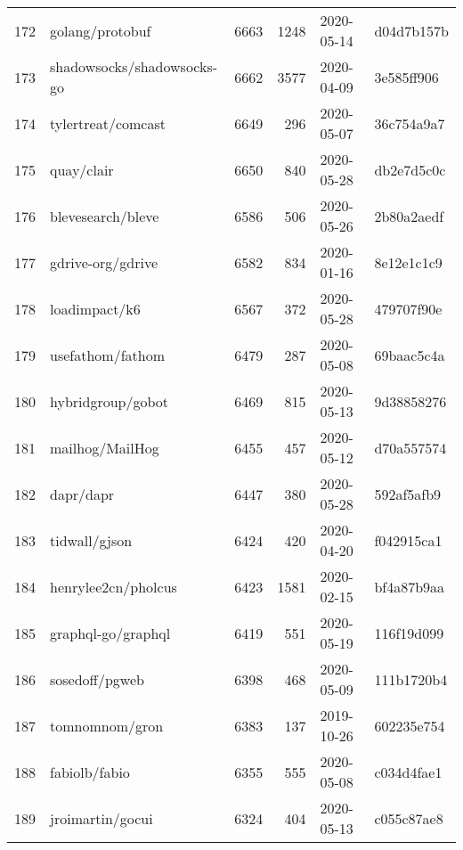 \begin{longtable}{llrrll}
    172 &                                    golang/protobuf &   6663 &   1248 & 2020-05-14 &  d04d7b157b \\
    173 &                         shadowsocks/shadowsocks-go &   6662 &   3577 & 2020-04-09 &  3e585ff906 \\
    174 &                                 tylertreat/comcast &   6649 &    296 & 2020-05-07 &  36c754a9a7 \\
    175 &                                         quay/clair &   6650 &    840 & 2020-05-28 &  db2e7d5c0c \\
    176 &                                  blevesearch/bleve &   6586 &    506 & 2020-05-26 &  2b80a2aedf \\
    177 &                                  gdrive-org/gdrive &   6582 &    834 & 2020-01-16 &  8e12e1c1c9 \\
    178 &                                      loadimpact/k6 &   6567 &    372 & 2020-05-28 &  479707f90e \\
    179 &                                   usefathom/fathom &   6479 &    287 & 2020-05-08 &  69baac5c4a \\
    180 &                                  hybridgroup/gobot &   6469 &    815 & 2020-05-13 &  9d38858276 \\
    181 &                                    mailhog/MailHog &   6455 &    457 & 2020-05-12 &  d70a557574 \\
    182 &                                          dapr/dapr &   6447 &    380 & 2020-05-28 &  592af5afb9 \\
    183 &                                      tidwall/gjson &   6424 &    420 & 2020-04-20 &  f042915ca1 \\
    184 &                                henrylee2cn/pholcus &   6423 &   1581 & 2020-02-15 &  bf4a87b9aa \\
    185 &                                 graphql-go/graphql &   6419 &    551 & 2020-05-19 &  116f19d099 \\
    186 &                                     sosedoff/pgweb &   6398 &    468 & 2020-05-09 &  111b1720b4 \\
    187 &                                     tomnomnom/gron &   6383 &    137 & 2019-10-26 &  602235e754 \\
    188 &                                      fabiolb/fabio &   6355 &    555 & 2020-05-08 &  c034d4fae1 \\
    189 &                                   jroimartin/gocui &   6324 &    404 & 2020-05-13 &  c055c87ae8 \\

\end{longtable}
